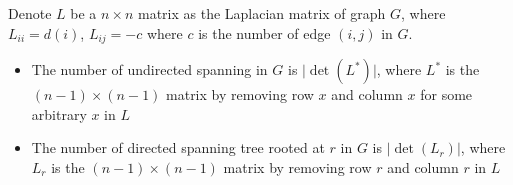 \normalsize
Denote $L$ be a $n \times n$ matrix as the Laplacian matrix of graph $G$, where $L_{ii} = d(i)$, $L_{ij} = -c$ where $c$ is the number of edge $(i, j)$ in $G$.
\begin{itemize}
    \item The number of undirected spanning in $G$ is $\lvert \det(L^{*}) \rvert$, where $L^{*}$ is the $(n - 1)\times (n - 1)$ matrix by removing row $x$ and column $x$ for some arbitrary $x$ in $L$
    \item The number of directed spanning tree rooted at $r$ in $G$ is $\lvert \det(L_r) \rvert$, where $L_r$ is the $(n - 1)\times (n - 1)$ matrix by removing row $r$ and column $r$ in $L$
\end{itemize}
